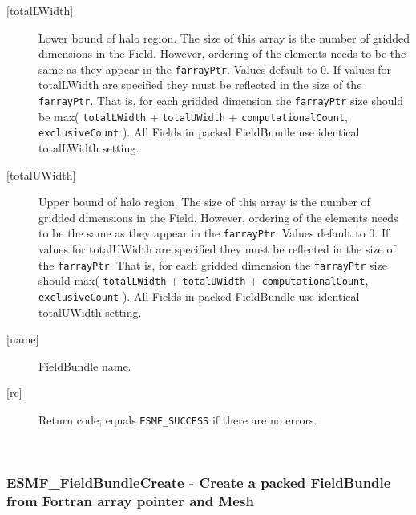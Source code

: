 \begin{description}
   \item [{[totalLWidth]}] 
   Lower bound of halo region. The size of this array is the number 
   of gridded dimensions in the Field. However, ordering of the elements 
   needs to be the same as they appear in the {\tt farrayPtr}. Values default 
   to 0. If values for totalLWidth are specified they must be reflected in 
   the size of the {\tt farrayPtr}. That is, for each gridded dimension the 
   {\tt farrayPtr} size should be max( {\tt totalLWidth} + {\tt totalUWidth} 
   + {\tt computationalCount}, {\tt exclusiveCount} ). 
   All Fields in packed FieldBundle use identical totalLWidth setting. 
   \item [{[totalUWidth]}] 
   Upper bound of halo region. The size of this array is the number 
   of gridded dimensions in the Field. However, ordering of the elements 
   needs to be the same as they appear in the {\tt farrayPtr}. Values default 
   to 0. If values for totalUWidth are specified they must be reflected in 
   the size of the {\tt farrayPtr}. That is, for each gridded dimension the 
   {\tt farrayPtr} size should max( {\tt totalLWidth} + {\tt totalUWidth} 
   + {\tt computationalCount}, {\tt exclusiveCount} ). 
   All Fields in packed FieldBundle use identical totalUWidth setting. 
   \item [{[name]}] 
   FieldBundle name. 
   \item [{[rc]}] 
   Return code; equals {\tt ESMF\_SUCCESS} if there are no errors. 
   \end{description} 
    
 
\mbox{}\hrulefill\ 
 
\subsubsection [ESMF\_FieldBundleCreate] {ESMF\_FieldBundleCreate - Create a packed FieldBundle from Fortran array pointer and Mesh }


